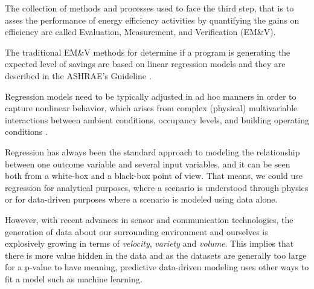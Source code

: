 \documentclass[3p,times,procedia]{elsarticle}
\begin{document}

The collection of methods and processes used to face the third step, that is to asses the performance of energy efficiency activities by quantifying the gains on efficiency are called Evaluation, Measurement, and Verification (EM\&V). 



The traditional EM\&V methods for determine if a program is generating the expected level of savings are based on linear regression models and they are described in the ASHRAE’s Guideline \cite{ashrae2002ashrae}. 

Regression models need to be typically adjusted in ad hoc manners in order to capture nonlinear behavior, which arises from complex (physical) multivariable interactions between ambient conditions, occupancy levels, and building operating conditions \cite{heo2012gaussian}.


Regression has always been the standard approach to modeling the relationship between one outcome variable  and several input variables, and it can be seen both from a white-box and a black-box point of view. That means, we could use regression for analytical purposes, where a scenario is understood through physics or for data-driven purposes where a scenario is modeled using data alone. 

However, with recent advances in sensor and communication technologies, the generation of data about our surrounding environment and ourselves is explosively growing in terms of \emph{velocity}, \emph{variety} and \emph{volume}. This implies that there is more value hidden in the data and as the datasets are generally too large for a p-value to have meaning, predictive data-driven modeling uses other ways to fit a model such as machine learning.

\end{document}
